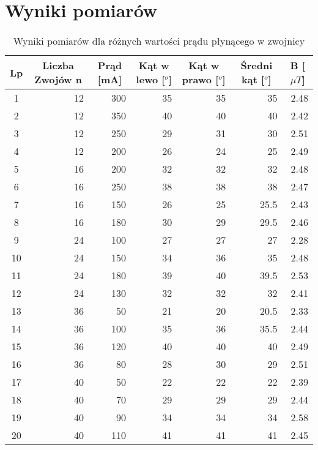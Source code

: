\documentclass{article}
\begin{document}

 


\section{Wyniki pomiarów}

\begin{table}[htbp]
\centering
\begin{tabular}{|c|r|r|r|r|r|r|}
\hline
Lp & \multicolumn{1}{c|}{Liczba Zwojów n} & \multicolumn{1}{c|}{Prąd [mA]} & \multicolumn{1}{c|}{Kąt w lewo [$^o$]} & \multicolumn{1}{c|}{Kąt w prawo [$^o$]} & \multicolumn{1}{c|}{Średni kąt [$^o$]} & \multicolumn{1}{c|}{B [$\mu T$]} \\ \hline
1 & 12 & 300 & 35 & 35 & 35 & 2.48 \\ \hline
2 & 12 & 350 & 40 & 40 & 40 & 2.42 \\ \hline
3 & 12 & 250 & 29 & 31 & 30 & 2.51 \\ \hline
4 & 12 & 200 & 26 & 24 & 25 & 2.49 \\ \hline
5 & 16 & 200 & 32 & 32 & 32 & 2.48 \\ \hline
6 & 16 & 250 & 38 & 38 & 38 & 2.47 \\ \hline
7 & 16 & 150 & 26 & 25 & 25.5 & 2.43 \\ \hline
8 & 16 & 180 & 30 & 29 & 29.5 & 2.46 \\ \hline
9 & 24 & 100 & 27 & 27 & 27 & 2.28 \\ \hline
10 & 24 & 150 & 34 & 36 & 35 & 2.48 \\ \hline
11 & 24 & 180 & 39 & 40 & 39.5 & 2.53 \\ \hline
12 & 24 & 130 & 32 & 32 & 32 & 2.41 \\ \hline
13 & 36 & 50 & 21 & 20 & 20.5 & 2.33 \\ \hline
14 & 36 & 100 & 35 & 36 & 35.5 & 2.44 \\ \hline
15 & 36 & 120 & 40 & 40 & 40 & 2.49 \\ \hline
16 & 36 & 80 & 28 & 30 & 29 & 2.51\\ \hline
17 & 40 & 50 & 22 & 22 & 22 & 2.39\\ \hline
18 & 40 & 70 & 29 & 29 & 29 & 2.44 \\ \hline
19 & 40 & 90 & 34 & 34 & 34 & 2.58 \\ \hline
20 & 40 & 110 & 41 & 41 & 41 & 2.45 \\ \hline
\end{tabular}
\caption{Wyniki pomiarów dla różnych wartości prądu płynącego w zwojnicy}
\label{}
\end{table}
\newpage
\end{document}
